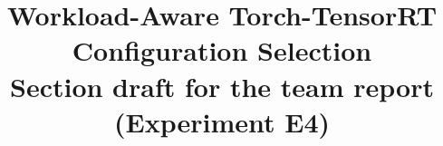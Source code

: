 \documentclass[conference]{IEEEtran}
\begin{document}
\title{Workload-Aware Torch-TensorRT Configuration Selection\\
{\large Section draft for the team report (Experiment E4)}}
\author{
}
\maketitle





\end{document}
